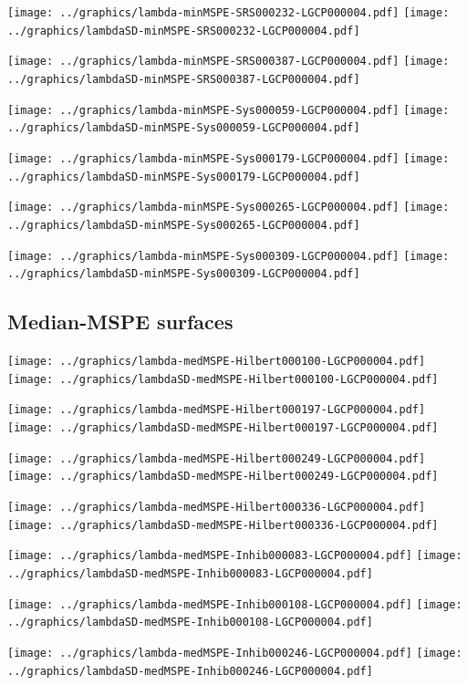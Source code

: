 \documentclass[review]{elsarticle}
\begin{document}
\texttt{[image: ../graphics/lambda-minMSPE-SRS000232-LGCP000004.pdf]}
\texttt{[image: ../graphics/lambdaSD-minMSPE-SRS000232-LGCP000004.pdf]}

\texttt{[image: ../graphics/lambda-minMSPE-SRS000387-LGCP000004.pdf]}
\texttt{[image: ../graphics/lambdaSD-minMSPE-SRS000387-LGCP000004.pdf]}

\texttt{[image: ../graphics/lambda-minMSPE-Sys000059-LGCP000004.pdf]}
\texttt{[image: ../graphics/lambdaSD-minMSPE-Sys000059-LGCP000004.pdf]}

\texttt{[image: ../graphics/lambda-minMSPE-Sys000179-LGCP000004.pdf]}
\texttt{[image: ../graphics/lambdaSD-minMSPE-Sys000179-LGCP000004.pdf]}

\texttt{[image: ../graphics/lambda-minMSPE-Sys000265-LGCP000004.pdf]}
\texttt{[image: ../graphics/lambdaSD-minMSPE-Sys000265-LGCP000004.pdf]}

\texttt{[image: ../graphics/lambda-minMSPE-Sys000309-LGCP000004.pdf]}
\texttt{[image: ../graphics/lambdaSD-minMSPE-Sys000309-LGCP000004.pdf]}

\subsection{Median-MSPE surfaces}

\texttt{[image: ../graphics/lambda-medMSPE-Hilbert000100-LGCP000004.pdf]}
\texttt{[image: ../graphics/lambdaSD-medMSPE-Hilbert000100-LGCP000004.pdf]}

\texttt{[image: ../graphics/lambda-medMSPE-Hilbert000197-LGCP000004.pdf]}
\texttt{[image: ../graphics/lambdaSD-medMSPE-Hilbert000197-LGCP000004.pdf]}

\texttt{[image: ../graphics/lambda-medMSPE-Hilbert000249-LGCP000004.pdf]}
\texttt{[image: ../graphics/lambdaSD-medMSPE-Hilbert000249-LGCP000004.pdf]}

\texttt{[image: ../graphics/lambda-medMSPE-Hilbert000336-LGCP000004.pdf]}
\texttt{[image: ../graphics/lambdaSD-medMSPE-Hilbert000336-LGCP000004.pdf]}

\texttt{[image: ../graphics/lambda-medMSPE-Inhib000083-LGCP000004.pdf]}
\texttt{[image: ../graphics/lambdaSD-medMSPE-Inhib000083-LGCP000004.pdf]}

\texttt{[image: ../graphics/lambda-medMSPE-Inhib000108-LGCP000004.pdf]}
\texttt{[image: ../graphics/lambdaSD-medMSPE-Inhib000108-LGCP000004.pdf]}

\texttt{[image: ../graphics/lambda-medMSPE-Inhib000246-LGCP000004.pdf]}
\texttt{[image: ../graphics/lambdaSD-medMSPE-Inhib000246-LGCP000004.pdf]}
\end{document}
